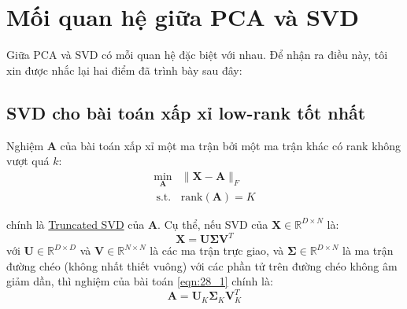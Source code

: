 
 
 
 
 
\section{Mối quan hệ giữa PCA và SVD}
Giữa PCA và SVD có mỗi quan hệ đặc biệt với nhau. Để nhận ra điều này, tôi xin được nhắc lại hai điểm đã trình bày sau đây: 
 
 
\subsection{SVD cho bài toán xấp xỉ low-rank tốt nhất}
Nghiệm $\mathbf{A}$ của bài toán xấp xỉ một ma trận bởi một ma trận khác có rank không vượt quá $k$: 
\begin{equation} 
\label{eqn:28_1}
\begin{aligned} 
  \min_{\mathbf{A}} &\|\mathbf{X} - \mathbf{A}\|_F \\\ 
  \text{s.t.} & \text{rank}(\mathbf{A}) = K 
\end{aligned} 
\end{equation} 
 
chính là \href{http://machinelearningcoban.com/2017/06/07/svd/#-truncated-svd}{Truncated SVD} của $\mathbf{A}$. Cụ thể, nếu SVD của $\mathbf{X} \in\mathbb{R}^{D\times N}$ là: 
\begin{equation} 
  \mathbf{X} = \mathbf{U}\mathbf{\Sigma}\mathbf{V}^T 
\end{equation} 
với $\mathbf{U} \in \mathbb{R}^{D \times D}$ và $\mathbf{V}\in \mathbb{R}^{N\times N}$ là các ma trận trực giao, và $\mathbf{\Sigma} \in \mathbb{R}^{D \times N}$ là ma trận đường chéo (không nhất thiết vuông) với các phần tử trên đường chéo không âm giảm dần, thì nghiệm của bài toán \eqref{eqn:28_1} chính là: 
\begin{equation} 
  \label{eqn:28_2}
  \mathbf{A} = \mathbf{U}_K \mathbf{\Sigma}_K \mathbf{V}_K^T
\end{equation} 
 

